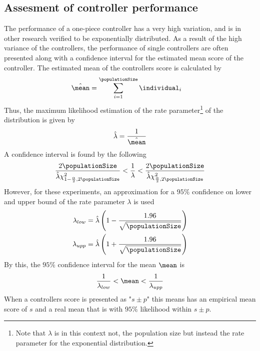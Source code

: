 \subsection{Assesment of controller performance}
The performance of a one-piece controller has a very high variation,
and is in other research verified to be exponentially distributed.
As a result of the high variance of the controllers, the performance 
of single controllers are often presented along with a confidence interval
for the estimated mean score of the controller. The estimated mean of 
the controllers score is calculated by
\begin{align*}
\hat{\mean} &= \sum_{i=1}^{\populationSize} \individual_i
\end{align*}
Thus, the maximum likelihood estimation of the rate 
parameter\footnote{Note that $\lambda$ is in this context not,
the population size but instead the rate parameter for the
exponential distribution.}
of the distribution is given by
\begin{align*}
\hat{\lambda} = \frac{1}{\hat{\mean}}
\end{align*}
A confidence interval is found by the following
\begin{align*}
\frac{2\populationSize}{\hat{\lambda}\chi^{2}_{1-\frac{\alpha}{2},2\populationSize}}
<
\frac{1}{\lambda}
< 
\frac{2\populationSize}{\hat{\lambda}\chi^{2}_{\frac{\alpha}{2},2\populationSize}}
\end{align*}
However, for these experiments, an approximation for a $95\%$
confidence on lower and upper bound 
of the rate parameter $\lambda$ is used
\begin{align*}
\lambda_{low} &= 
\hat{\lambda} \left( 1 - \frac{1.96}{\sqrt{\populationSize}} \right)\\
\lambda_{upp} &= 
\hat{\lambda} \left( 1 + \frac{1.96}{\sqrt{\populationSize}} \right)
\end{align*}
By this, the $95\%$ confidence interval for the mean $\mean$ is
\begin{align*}
\frac{1}{\lambda_{low}} < \mean < \frac{1}{\lambda_{upp}}
\end{align*}
When a controllers score is presented as "$s \pm p$" this means 
has an empirical mean score of $s$ and a real mean that is with 
$95\%$ likelihood within $s \pm p$. \\
